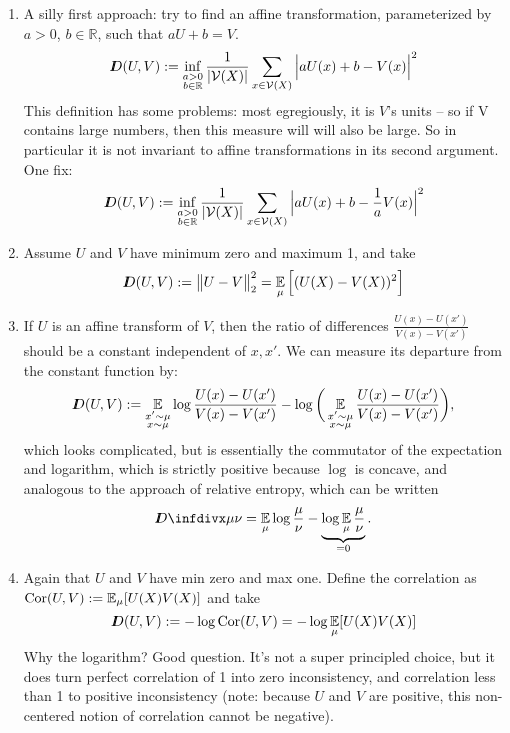 \documentclass{article}
\begin{document}
    \begin{enumerate}
    \item A silly first approach: try to find an affine transformation, parameterized by $a > 0$, $b \in \mathbb R$, such that $a U + b = V$.
     \begin{equation*}
        I\mkern-8muD(U, V) := \inf_{\substack{a > 0\\b \in \mathbb R}}  \frac{1}{|\mathcal V(X)|}\sum_{x \in \mathcal V(X)} \Big| a U(x) + b - V(x) \Big|^2
        \end{equation*}
        This definition has some problems: most egregiously, it is $V$'s units -- so if V contains large numbers, then this measure will will also be large. So in particular it is not invariant to affine transformations in its second argument. One fix:
        \[
        I\mkern-8muD(U, V) := \inf_{\substack{a > 0\\b \in \mathbb R}}  \frac{1}{|\mathcal V(X)|}\sum_{x \in \mathcal V(X)} \Big| a U(x) + b - \frac1a V(x) \Big|^2
        \]
    \item Assume $U$ and $V$ have minimum zero and maximum 1, and take
    \[ I\mkern-8muD(U,V) := \big\Vert U - V \big\Vert^2_2 = \operatorname*{\mathbb{E}}_\mu \Big[(U(X) - V(X))^2\Big]  \]
    \item If $U$ is an affine transform of $V$, then the ratio of differences $\frac{U(x) - U(x')}{V(x)- V(x')}$ should be a constant independent of $x,x'$. We can measure its departure from the constant function by:
    \[
        I\mkern-8muD(U,V) := \operatorname*{\mathbb{E}}_{\substack{x' \sim \mu \\ x \sim \mu}} \log \frac{U(x) - U(x')}{V(x)- V(x')} -
         \log \bigg(\operatorname*{\mathbb{E}}_{\substack{x' \sim \mu \\ x \sim \mu}}\frac{U(x) - U(x')}{V(x)- V(x')} \bigg),
    \]
    which looks complicated, but is essentially the commutator of the expectation and logarithm, which is strictly positive because $\log$ is concave, and analogous to the approach of relative entropy, which can be written
    \[ \kldiv\mu\nu = \Ex_\mu \log \frac\mu\nu - \underbrace{\log \Ex_\mu \frac{\mu}{\nu}}_{=0}. \]

    \item Again that $U$ and $V$ have min zero and max one. Define the correlation as $\mathrm{Cor}(U,V) := \operatorname*{\mathbb{E}}_{\mu}[U(X)V(X)]$ and take
    \[
        I\mkern-8muD(U,V) := - \log \mathrm{Cor}(U,V) = - \log \operatorname*{\mathbb{E}}_\mu [U(X) V(X)]
    \]
    Why the logarithm? Good question. It's not a super principled choice, but it does turn perfect correlation of 1 into zero inconsistency, and correlation less than 1 to positive inconsistency (note: because $U$ and $V$ are positive, this non-centered notion of correlation cannot be negative).
\end{enumerate}
\end{document}
